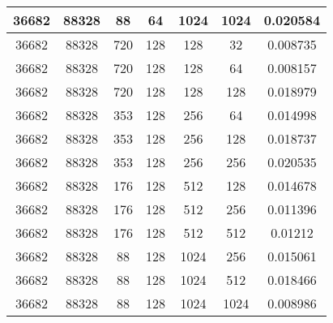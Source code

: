 \documentclass[9pt]{article}
\begin{document}
\begin{tabular}{|c|c|c|c|c|c|c| }
\hline
36682  & 88328  & 88  & 64  & 1024  & 1024  & 0.020584 \\
\hline
36682  & 88328  & 720  & 128  & 128  & 32  & 0.008735 \\
\hline
36682  & 88328  & 720  & 128  & 128  & 64  & 0.008157 \\
\hline
36682  & 88328  & 720  & 128  & 128  & 128  & 0.018979 \\
\hline
36682  & 88328  & 353  & 128  & 256  & 64  & 0.014998 \\
\hline
36682  & 88328  & 353  & 128  & 256  & 128  & 0.018737 \\
\hline
36682  & 88328  & 353  & 128  & 256  & 256  & 0.020535 \\
\hline
36682  & 88328  & 176  & 128  & 512  & 128  & 0.014678 \\
\hline
36682  & 88328  & 176  & 128  & 512  & 256  & 0.011396 \\
\hline
36682  & 88328  & 176  & 128  & 512  & 512  & 0.01212 \\
\hline
36682  & 88328  & 88  & 128  & 1024  & 256  & 0.015061 \\
\hline
36682  & 88328  & 88  & 128  & 1024  & 512  & 0.018466 \\
\hline
36682  & 88328  & 88  & 128  & 1024  & 1024  & 0.008986 \\
\hline
\end{tabular}
 
\end{document}
